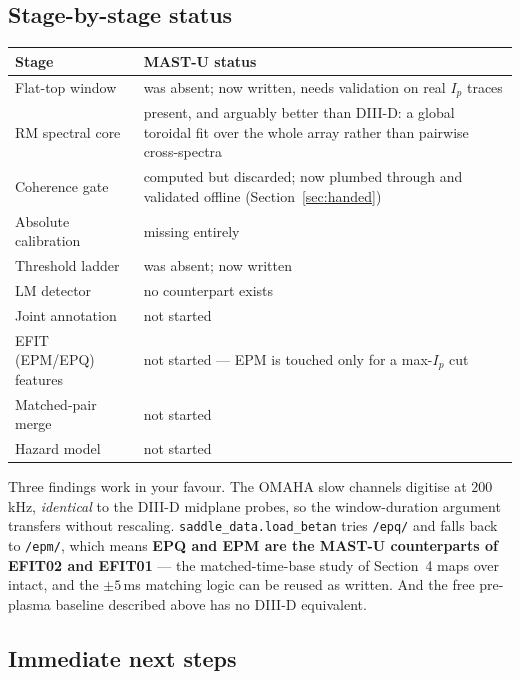 \documentclass[11pt,a4paper]{article}
\newcommand{\code}[1]{\texttt{\small #1}}
\begin{document}
\subsection{Stage-by-stage status}

\begin{center}
\begin{tabular}{@{}>{\raggedright\arraybackslash}p{}>{\raggedright\arraybackslash}p{}@{}}
\toprule
\textbf{Stage} & \textbf{MAST-U status} \\
\midrule
Flat-top window & was absent; now written, needs validation on real $I_p$ traces \\
RM spectral core & present, and arguably better than DIII-D: a global toroidal fit over the whole array rather than pairwise cross-spectra \\
Coherence gate & computed but discarded; now plumbed through and validated offline (Section~\ref{sec:handed}) \\
Absolute calibration & missing entirely \\
Threshold ladder & was absent; now written \\
LM detector & no counterpart exists \\
Joint annotation & not started \\
EFIT (EPM/EPQ) features & not started --- EPM is touched only for a max-$I_p$ cut \\
Matched-pair merge & not started \\
Hazard model & not started \\
\bottomrule
\end{tabular}
\end{center}

\noindent
Three findings work in your favour. The OMAHA slow channels digitise at $200$\,kHz,
\emph{identical} to the DIII-D midplane probes, so the window-duration argument transfers
without rescaling. \code{saddle\_data.load\_betan} tries \code{/epq/} and falls back to
\code{/epm/}, which means \textbf{EPQ and EPM are the MAST-U counterparts of EFIT02 and
EFIT01} --- the matched-time-base study of Section~4 maps over intact, and the $\pm5$\,ms
matching logic can be reused as written. And the free pre-plasma baseline described above
has no DIII-D equivalent.

\subsection{Immediate next steps}
\end{document}

